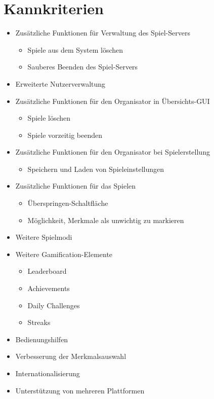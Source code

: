 \documentclass[a4paper]{scrreprt}
\begin{document}
    \section{Kannkriterien}
    \begin{itemize} %
    	\item Zusätzliche Funktionen für Verwaltung des \Gls{Spiel-Server}s
   	\begin{itemize}
            \item Spiele aus dem System löschen
            \item Sauberes Beenden des \Gls{Spiel-Server}s
        \end{itemize}
	\item Erweiterte Nutzerverwaltung 
	\item Zusätzliche Funktionen für den \Gls{Organisator} in Übersichts-GUI
        \begin{itemize}
            \item Spiele löschen 
            \item Spiele vorzeitig beenden 
        \end{itemize}
	\item Zusätzliche Funktionen für den \Gls{Organisator} bei Spielerstellung
        \begin{itemize}
            \item Speichern und Laden von \Gls{Spieleinstellungen}
        \end{itemize}
        \item Zusätzliche Funktionen für das Spielen 
        \begin{itemize}
            \item Überspringen-Schaltfläche 
            \item Möglichkeit, Merkmale als unwichtig zu markieren 
        \end{itemize}
	\item Weitere Spielmodi 
	\item Weitere Gamification-Elemente %
        \begin{itemize}
            \item Leaderboard %
            \item Achievements %
            \item Daily Challenges %
            \item Streaks %
        \end{itemize}
        \item Bedienungshilfen 
        \item Verbesserung der Merkmalsauswahl %
        \item Internationalisierung 
        \item Unterstützung von mehreren Plattformen
    \end{itemize}
\end{document}
